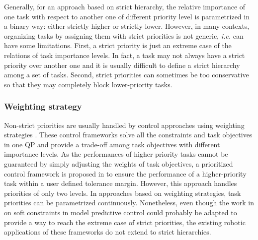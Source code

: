 \documentclass[12pt,a4paper,twoside]{article}
\begin{document}
Generally, for an approach based on strict hierarchy, the relative importance of one task with respect to another one of different priority level is parametrized in a binary way: either strictly higher or strictly lower.
However, in many contexts, organizing tasks by assigning them with strict priorities is not generic, \textit{i.e.} can have some limitations. First, a strict priority is just an extreme case of the relations of task importance levels. In fact, a task may not always have a strict priority over another one and it is usually difficult to define a strict hierarchy among a set of tasks. 
Second, strict priorities can sometimes be too conservative so that they may completely block lower-priority tasks. 

\subsubsection{Weighting strategy}
Non-strict priorities are usually handled by control approaches using weighting strategies \cite{Abe07,Collette07,Liu11,Salini11,Bouyarmane11}.
These control frameworks solve all the constraints and task objectives in one QP and provide a trade-off among task objectives with different importance levels. 
As the performances of higher priority tasks cannot be guaranteed by simply adjusting the weights of task objectives, a prioritized control framework is proposed in \cite{Liu12} to ensure the performance of a higher-priority task within a user defined tolerance margin. However, this approach handles priorities of only two levels. 
In approaches based on weighting strategies, task priorities can be parametrized continuously. Nonetheless, even though the work in \cite{kerrigan2000} on soft constraints in model predictive control could probably be adapted to provide a way to reach the extreme case of strict priorities, the existing robotic applications of these frameworks do not extend to strict hierarchies.
\end{document}
